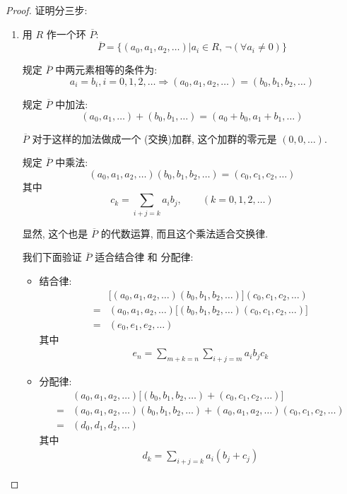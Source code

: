 \documentclass[utf8]{ctexbook}
\theoremstyle{definition}
\begin{document}
\begin{proof}
证明分三步:
\begin{enumerate}
\item{用 $R$ 作一个环 $\overline{P}$: 
\begin{equation}
\overline{P} = \{ (a_0, a_1, a_2, \ldots) | a_i \in R, \, \lnot (\forall a_i \neq 0) \} \nonumber
\end{equation}

规定 $\overline{P}$ 中两元素相等的条件为:
\begin{equation}
a_i = b_i , i = 0, 1, 2, \ldots \Longrightarrow (a_0, a_1, a_2, \ldots ) = (b_0, b_1, b_2, \ldots ) \nonumber
\end{equation}

规定 $\overline{P}$ 中加法:
\begin{equation}
(a_0, a_1, \ldots ) + (b_0, b_1, \ldots ) = (a_0 + b_0 , a_1 + b_1, \ldots ) \nonumber
\end{equation}

$\overline{P}$ 对于这样的加法做成一个 (交换)加群, 这个加群的零元是 $(0,0,\ldots)$.

规定 $\overline{P}$ 中乘法:
\begin{equation}
(a_0, a_1, a_2, \ldots ) (b_0, b_1, b_2, \ldots ) = (c_0, c_1, c_2, \ldots) \nonumber
\end{equation}
其中
\begin{equation}
c_k = \sum_{i+j = k} a_i b_j ,\quad \quad (k=0,1,2, \ldots) \nonumber
\end{equation}

显然, 这个也是 $\overline{P}$ 的代数运算, 而且这个乘法适合交换律.

我们下面验证 $\overline{P}$ 适合结合律 和 分配律:
\begin{itemize}
\item{结合律: 
\begin{align*}
& \big[(a_0, a_1, a_2, \ldots)(b_0, b_1, b_2, \ldots)\big](c_0, c_1, c_2, \ldots) \\
= & (a_0, a_1, a_2, \ldots)\big[(b_0, b_1, b_2, \ldots)(c_0, c_1, c_2, \ldots)\big] \\
= & (e_0, e_1, e_2, \ldots)
\end{align*}
其中
\begin{align*}
e_n = \sum_{m+k = n} \sum_{i+j=m} a_i b_j c_k
\end{align*}

}
\item{分配律:
\begin{align*}
& (a_0, a_1, a_2, \ldots)\big[ (b_0, b_1, b_2, \ldots) + (c_0, c_1, c_2, \ldots) \big]\\
= &  (a_0, a_1, a_2, \ldots)  (b_0, b_1, b_2, \ldots) + (a_0, a_1, a_2, \ldots)  (c_0, c_1, c_2, \ldots) \\
= & (d_0, d_1, d_2, \ldots)
\end{align*}
其中
\begin{align*}
d_k = \sum_{i+j=k} a_i (b_j + c_j)
\end{align*}
}
\end{itemize}

}
\end{enumerate}
\end{proof}
\end{document}
